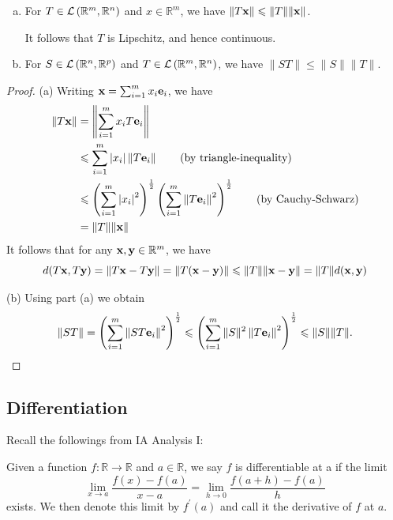 \documentclass[a4paper]{article}
\begin{document}
\begin{lemma}\label{lma:11.1}
    \begin{enumerate}[(a)]
        \item For $T \in {\mathcal{L}}\left(\mathbb{R}^{m}, \mathbb{R}^{n}\right)$ and $x \in \mathbb{R}^{m}$, we have $\|T {\bf x}\| \leqslant\|T\|\|{\bf x}\|$.

        It follows that $T$ is Lipschitz, and hence continuous.
        
        \item For $S \in {\mathcal{L}}\left(\mathbb{R}^{n}, \mathbb{R}^{p}\right)$ and $T \in {\mathcal{L}}\left(\mathbb{R}^{m}, \mathbb{R}^{n}\right)$, we have $\|S T\| \leqslant\|S\|\|T\|$.
    \end{enumerate}
\end{lemma}
\begin{proof}
    (a) Writing ${\bf x}=\sum_{i=1}^{m} x_{i} {\bf e}_{i}$, we have
\begin{align*}
\|T {\bf x}\| &=\left\|\sum_{i=1}^{m} x_{i} T {\bf e}_{i}\right\| \\
& \leqslant \sum_{i=1}^{m}\left|x_{i}\right|\left\|T {\bf e}_{i}\right\| \tag{by triangle-inequality}\\
& \leqslant\left(\sum_{i=1}^{m}\left|x_{i}\right|^{2}\right)^{\frac{1}{2}}\left(\sum_{i=1}^{m}\left\|T {\bf e}_{i}\right\|^{2}\right)^{\frac{1}{2}} \tag{by Cauchy-Schwarz}\\
&=\|T\|\|{\bf x}\|
\end{align*}
It follows that for any ${\bf x}, {\bf y} \in \mathbb{R}^{m}$, we have
$$
d(T {\bf x}, T {\bf y})=\|T {\bf x}-T {\bf y}\|=\|T({\bf x}-{\bf y})\| \leqslant\|T\|\|{\bf x}-{\bf y}\|=\|T\| d({\bf x}, {\bf y})
$$

(b) Using part (a) we obtain
$$
\|S T\|=\left(\sum_{i=1}^{m}\left\|S T {\bf e}_{i}\right\|^{2}\right)^{\frac{1}{2}} \leqslant\left(\sum_{i=1}^{m}\|S\|^{2}\left\|T {\bf e}_{i}\right\|^{2}\right)^{\frac{1}{2}} \leqslant\|S\|\|T\|.\qedhere
$$
\end{proof}

\subsection{Differentiation}
Recall the followings from IA Analysis I:

Given a function $f: \mathbb{R} \rightarrow \mathbb{R}$ and $a \in \mathbb{R}$, we say $f$ is differentiable at a if the limit
$$
\lim _{x \rightarrow a} \frac{f(x)-f(a)}{x-a}=\lim _{h \rightarrow 0} \frac{f(a+h)-f(a)}{h}
$$
exists. We then denote this limit by $f^{\prime}(a)$ and call it the derivative of $f$ at $a$. 
\end{document}
